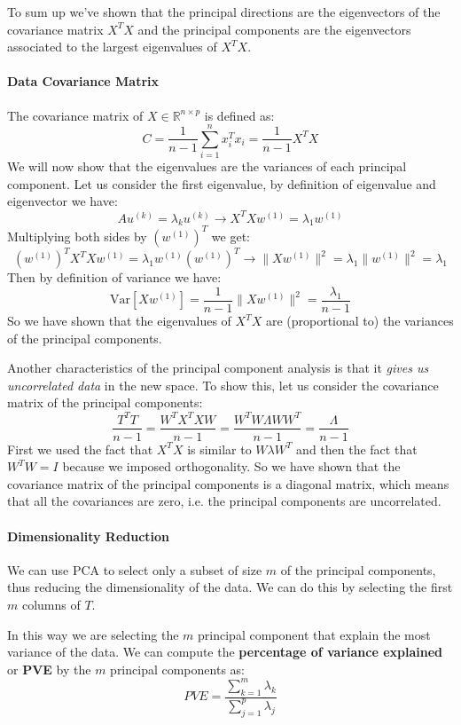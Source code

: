 To sum up we've shown that the principal directions are the eigenvectors of the covariance matrix $X^T X$ and the principal components are the eigenvectors associated to the largest eigenvalues of $X^T X$.

\paragraph*{Data Covariance Matrix}
The covariance matrix of $X \in \mathbb{R}^{n \times p}$ is defined as:
\[
    C = \frac{1}{n-1} \sum_{i=1}^n x_i^T x_i = \frac{1}{n-1} X^T X
\]
We will now show that the eigenvalues are the variances of each principal component. Let us consider the first eigenvalue, by definition of eigenvalue and eigenvector we have:
\[
    A u^{(k)} = \lambda_k u^{(k)} \to X^T X w^{(1)} = \lambda_1 w^{(1)}
\]
Multiplying both sides by $(w^{(1)})^T$ we get:
\[
    (w^{(1)})^T X^T X w^{(1)} = \lambda_1 w^{(1)}(w^{(1)})^T \to \|X w^{(1)}\|^2 = \lambda_1 \|w^{(1)} \|^2 = \lambda_1
\]
Then by definition of variance we have:
\[
    \text{Var}\left[X w^{(1)}\right] = \frac{1}{n-1} \|X w^{(1)}\|^2 = \frac{\lambda_1}{n-1}
\]
So we have shown that the eigenvalues of $X^T X$ are (proportional to) the variances of the principal components.

Another characteristics of the principal component analysis is that it \textit{gives us uncorrelated data} in the new space. To show this, let us consider the covariance matrix of the principal components:
\[
    \frac{T^T T}{n-1} = \frac{W^T X^T X W}{n-1} = \frac{W^T W \Lambda W W^T}{n-1} = \frac{\Lambda}{n-1}
\]
First we used the fact that $X^T X$ is similar to $W \lambda W^T$ and then the fact that $W^T W = I$ because we imposed orthogonality.
So we have shown that the covariance matrix of the principal components is a diagonal matrix, which means that all the covariances are zero, i.e. the principal components are uncorrelated.

\paragraph*{Dimensionality Reduction}
We can use PCA to select only a subset of size $m$ of the principal components, thus reducing the dimensionality of the data. We can do this by selecting the first $m$ columns of $T$.

In this way we are selecting the $m$ principal component that explain the most variance of the data. We can compute the \textbf{percentage of variance explained} or \textbf{PVE} by the $m$ principal components as:
\[
    PVE = \frac{\sum_{k=1}^m \lambda_k}{\sum_{j=1}^p \lambda_j}
\]

